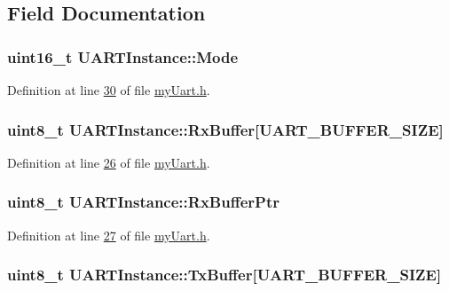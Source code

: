 \subsection{Field Documentation}
\hypertarget{struct_u_a_r_t_instance_a6cdb50e2027bf68b7ad66e2863c1ae29}{
\subsubsection[{Mode}]{\setlength{\rightskip}{0pt plus 5cm}uint16\-\_\-t U\-A\-R\-T\-Instance\-::\-Mode}}\label{struct_u_a_r_t_instance_a6cdb50e2027bf68b7ad66e2863c1ae29}


Definition at line \hyperlink{my_uart_8h_source_l00030}{30} of file \hyperlink{my_uart_8h_source}{my\-Uart.\-h}.

\hypertarget{struct_u_a_r_t_instance_a19e526bc57bbb10939b53ea13eee30fa}{
\subsubsection[{Rx\-Buffer}]{\setlength{\rightskip}{0pt plus 5cm}uint8\-\_\-t U\-A\-R\-T\-Instance\-::\-Rx\-Buffer\mbox{[}{\bf U\-A\-R\-T\-\_\-\-B\-U\-F\-F\-E\-R\-\_\-\-S\-I\-Z\-E}\mbox{]}}}\label{struct_u_a_r_t_instance_a19e526bc57bbb10939b53ea13eee30fa}


Definition at line \hyperlink{my_uart_8h_source_l00026}{26} of file \hyperlink{my_uart_8h_source}{my\-Uart.\-h}.

\hypertarget{struct_u_a_r_t_instance_a207dabce7103416b36680d9ecc050684}{
\subsubsection[{Rx\-Buffer\-Ptr}]{\setlength{\rightskip}{0pt plus 5cm}uint8\-\_\-t U\-A\-R\-T\-Instance\-::\-Rx\-Buffer\-Ptr}}\label{struct_u_a_r_t_instance_a207dabce7103416b36680d9ecc050684}


Definition at line \hyperlink{my_uart_8h_source_l00027}{27} of file \hyperlink{my_uart_8h_source}{my\-Uart.\-h}.

\hypertarget{struct_u_a_r_t_instance_a77d9f6986b01073dd0d2385d2e34f961}{
\subsubsection[{Tx\-Buffer}]{\setlength{\rightskip}{0pt plus 5cm}uint8\-\_\-t U\-A\-R\-T\-Instance\-::\-Tx\-Buffer\mbox{[}{\bf U\-A\-R\-T\-\_\-\-B\-U\-F\-F\-E\-R\-\_\-\-S\-I\-Z\-E}\mbox{]}}}\label{struct_u_a_r_t_instance_a77d9f6986b01073dd0d2385d2e34f961}


